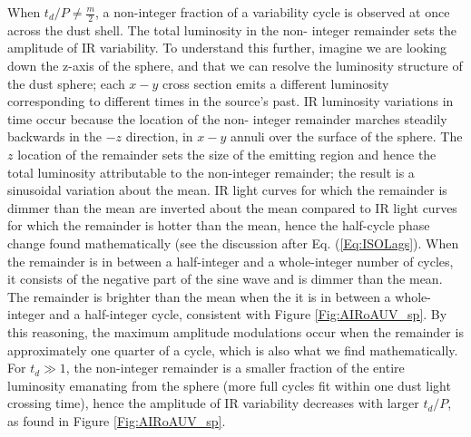 When $t_d/P \neq \frac{m}{2}$, a non-integer fraction of a variability cycle
is observed at once across the dust shell. The total luminosity in the non-
integer remainder sets the amplitude of IR variability. To understand this
further, imagine we are looking down the z-axis of the sphere, and that we can
resolve the luminosity structure of the dust sphere; each $x-y$ cross section
emits a different luminosity corresponding to different times in the source's
past. IR luminosity variations in time occur because the location of the non-
integer remainder marches steadily backwards in the $-z$ direction, in $x-y$
annuli over the surface of the sphere. The $z$ location of the remainder sets
the size of the emitting region and hence the total luminosity attributable to
the non-integer remainder; the result is a sinusoidal variation about the
mean. IR light curves for which the remainder is dimmer than the mean are
inverted about the mean compared to IR light curves for which the remainder is
hotter than the mean, hence the half-cycle phase change found mathematically
(see the discussion after Eq. (\ref{Eq:ISOLags}). When the remainder is in
between a half-integer and a whole-integer number of cycles, it consists of
the negative part of the sine wave and is dimmer than the mean. The remainder
is brighter than the mean when the it is in between a whole-integer and a
half-integer cycle, consistent with Figure \ref{Fig:AIRoAUV_sp}. By this
reasoning, the maximum amplitude modulations occur when the remainder is
approximately one quarter of a cycle, which is also what we find
mathematically. For $t_d \gg 1$, the non-integer remainder is a smaller
fraction of the entire luminosity emanating from the sphere (more full cycles
fit within one dust light crossing time), hence the amplitude of IR
variability decreases with larger $t_d/P$, as found in Figure
\ref{Fig:AIRoAUV_sp}.






